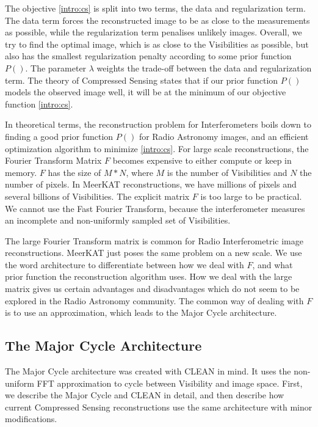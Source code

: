 The objective \eqref{intro:cs} is split into two terms, the data and regularization term. The data term forces the reconstructed image to be as close to the measurements as possible, while the regularization term penalises unlikely images. Overall, we try to find the optimal image, which is as close to the Visibilities as possible, but also has the smallest regularization penalty according to some prior function $P()$. The parameter $\lambda$ weights the trade-off between the data and regularization term. The theory of Compressed Sensing states that if our prior function $P()$ models the observed image well, it will be at the minimum of our objective function \eqref{intro:cs}.

In theoretical terms, the reconstruction problem for Interferometers boils down to finding a good prior function $P()$ for Radio Astronomy images, and an efficient optimization algorithm to minimize \eqref{intro:cs}. For large scale reconstructions, the Fourier Transform Matrix $F$ becomes expensive to either compute or keep in memory. $F$ has the size of $M*N$, where $M$ is the number of Visibilities and $N$ the number of pixels. In MeerKAT reconstructions, we have millions of pixels and several billions of Visibilities. The explicit matrix $F$ is too large to be practical. We cannot use the Fast Fourier Transform, because the interferometer measures an incomplete and non-uniformly sampled set of Visibilities.

The large Fourier Transform matrix is common for Radio Interferometric image reconstructions. MeerKAT just poses the same problem on a new scale. We use the word architecture to differentiate between how we deal with $F$, and what prior function the reconstruction algorithm uses. How we deal with the large matrix gives us certain advantages and disadvantages which do not seem to be explored in the Radio Astronomy community. The common way of dealing with $F$ is to use an approximation, which leads to the Major Cycle architecture. 


\subsection{The Major Cycle Architecture}
The Major Cycle architecture was created with CLEAN in mind. It uses the non-uniform FFT approximation to cycle between Visibility and image space. First, we describe the Major Cycle and CLEAN in detail, and then describe how current Compressed Sensing reconstructions use the same architecture with minor modifications.

